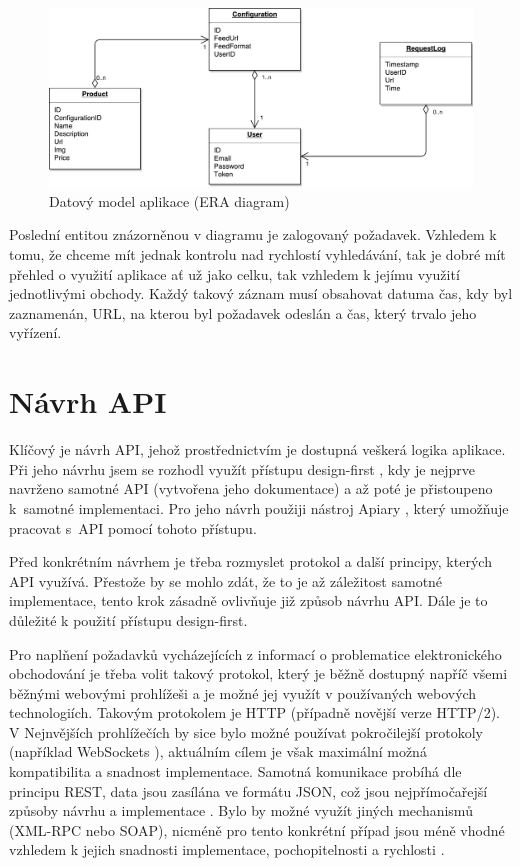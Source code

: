 \documentclass[FM,DP]{tulthesis}
\begin{document}
\begin{figure}[h]
\center
\includegraphics[width=\textwidth]{era-diagram.pdf}
\caption[Datový model aplikace]{Datový model aplikace (ERA diagram)}
\label{datovy-model}
\end{figure}

Poslední entitou znázorněnou v diagramu je zalogovaný požadavek. Vzhledem k tomu, 
že chceme mít jednak kontrolu nad rychlostí vyhledávání, tak je dobré mít
přehled o využití aplikace ať už jako celku, tak vzhledem k jejímu využití jednotlivými
obchody. Každý takový záznam musí obsahovat datuma  čas, kdy byl zaznamenán, 
URL, na kterou byl požadavek odeslán a čas, který trvalo jeho vyřízení.

\section{Návrh API}

Klíčový je návrh API, jehož prostřednictvím je dostupná veškerá logika aplikace. 
Při jeho návrhu jsem se rozhodl využít přístupu design-first \cite{apiary-design}, 
kdy je nejprve navrženo samotné API (vytvořena jeho dokumentace) a až poté je přistoupeno 
k~samotné implementaci. Pro jeho návrh použiji nástroj Apiary \cite{apiary}, který umožňuje 
pracovat s~API pomocí tohoto přístupu.

Před konkrétním návrhem je třeba rozmyslet protokol a další principy, kterých API využívá.
Přestože by se mohlo zdát, že to je až záležitost samotné implementace, tento krok zásadně
ovlivňuje již způsob návrhu API. Dále je to důležité k použití přístupu design-first.

Pro naplňení požadavků vycházejících z informací o problematice elektronického obchodování
je třeba volit takový protokol, který je běžně dostupný napříč všemi běžnými webovými
prohlížeši a je možné jej využít v používaných webových technologiích. Takovým protokolem
je HTTP (případně novější verze HTTP/2). V Nejnvějších prohlížečích by sice bylo možné
používat pokročilejší protokoly (například WebSockets \cite{websockets}), aktuálním cílem
je však maximální možná kompatibilita a snadnost implementace. Samotná komunikace probíhá
dle principu REST, data jsou zasílána ve formátu JSON, což jsou nejpřímočařejší způsoby
návrhu a implementace \cite{api}. Bylo by možné využít jiných mechanismů (XML-RPC nebo SOAP), 
nicméně pro tento konkrétní případ jsou méně vhodné vzhledem k jejich snadnosti implementace, 
pochopitelnosti a rychlosti \cite[strana~31]{api}.
\end{document}
